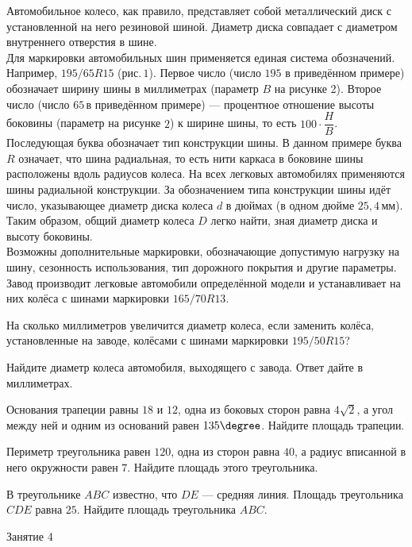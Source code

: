 \begin{homework}[number=3]
	Автомобильное колесо, как правило, представляет собой металлический диск с установленной на него резиновой шиной. Диаметр диска совпадает с диаметром внутреннего отверстия в шине.\\		
	Для маркировки автомобильных шин применяется единая система обозначений. Например, \( 195/65 R15 \) (рис. \( 1 \)). Первое число (число \( 195 \) в приведённом примере) обозначает ширину шины в миллиметрах (параметр \( B \) на рисунке 2\(  \)). Второе число (число \( 65 \) в приведённом примере) --- процентное отношение высоты боковины (параметр на рисунке \( 2 \)) к ширине шины, то есть \( 100\cdot\dfrac{H}{B} \). \\		
	Последующая буква обозначает тип конструкции шины. В данном примере буква \( R \) означает, что шина радиальная, то есть нити каркаса в боковине шины расположены вдоль радиусов колеса. На всех легковых автомобилях применяются шины радиальной конструкции.		
	За обозначением типа конструкции шины идёт число, указывающее диаметр диска колеса \( d \) в дюймах (в одном дюйме \( 25,4 \) мм). Таким образом, общий диаметр колеса \( D \) легко найти, зная диаметр диска и высоту боковины.\\		
	Возможны дополнительные маркировки, обозначающие допустимую нагрузку на шину, сезонность использования, тип дорожного покрытия и другие параметры.\\
	Завод производит легковые автомобили определённой модели и устанавливает на них колёса с шинами маркировки \( 165/70 R13 \).\\
	\begin{listofex}
		\item На сколько миллиметров увеличится диаметр колеса, если заменить колёса, установленные на заводе, колёсами с шинами маркировки \( 195/50 R15 \)?
		\item Найдите диаметр колеса автомобиля, выходящего с завода. Ответ дайте в миллиметрах.
		\item Основания трапеции равны \( 18 \) и \( 12 \), одна из боковых сторон равна \( 4\sqrt{2} \), а угол между ней и одним из оснований равен \( 135\degree \). Найдите площадь трапеции.
		\item Периметр треугольника равен \( 120 \), одна из сторон равна \( 40 \), а радиус вписанной в него окружности равен \( 7 \). Найдите площадь этого треугольника.
		\item В треугольнике \( ABC \) известно, что \( DE \) --- средняя линия. Площадь треугольника \( CDE \) равна \( 25 \). Найдите площадь треугольника \( ABC \).
	\end{listofex}
\end{homework}

\begin{class}[number=4]
	\begin{listofex}
		\item Занятие 4
	\end{listofex}
\end{class}
